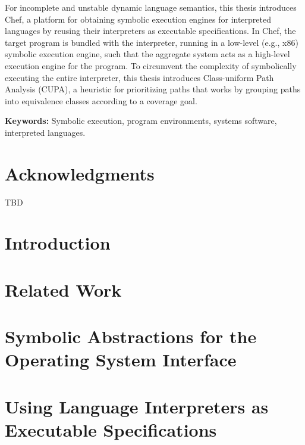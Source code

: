 \documentclass[letterpaper,10pt,oneside]{book}
\begin{document}
For incomplete and unstable dynamic language semantics, this thesis introduces Chef, a platform for obtaining symbolic execution engines for interpreted languages by reusing their interpreters as executable specifications.  In Chef, the target program is bundled with the interpreter, running in a low-level (e.g., x86) symbolic execution engine, such that the aggregate system acts as a high-level execution engine for the program.
%
%
To circumvent the complexity of symbolically executing the entire interpreter, this thesis introduces Class-uniform Path Analysis (CUPA), a heuristic for prioritizing paths that works by grouping paths into equivalence classes according to a coverage goal.

\noindent \textbf{Keywords:} Symbolic execution, program environments, systems software, interpreted languages.


\chapter*{Acknowledgments}

TBD

\tableofcontents
\listoffigures
\listoftables

\chapter{Introduction}
\label{ch:introduction}



\chapter{Related Work}
\label{ch:relatedwork}



\chapter{Symbolic Abstractions for the Operating System Interface}
\label{ch:cloud9}


\chapter{Using Language Interpreters as Executable Specifications}
\label{ch:chef}

\end{document}
